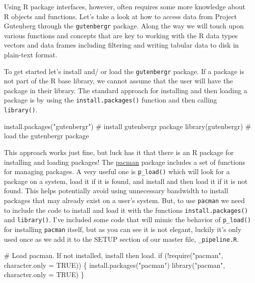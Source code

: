\documentclass[
  letterpaper,
]{latex/krantz}
\newenvironment{Shaded}{\begin{snugshade}}{\end{snugshade}}
\newcommand{\AttributeTok}[1]{\textcolor[rgb]{0.40,0.45,0.13}{#1}}
\newcommand{\CommentTok}[1]{\textcolor[rgb]{0.37,0.37,0.37}{#1}}
\newcommand{\ConstantTok}[1]{\textcolor[rgb]{0.56,0.35,0.01}{#1}}
\newcommand{\ControlFlowTok}[1]{\textcolor[rgb]{0.00,0.23,0.31}{#1}}
\newcommand{\FunctionTok}[1]{\textcolor[rgb]{0.28,0.35,0.67}{#1}}
\newcommand{\NormalTok}[1]{\textcolor[rgb]{0.00,0.23,0.31}{#1}}
\newcommand{\SpecialCharTok}[1]{\textcolor[rgb]{0.37,0.37,0.37}{#1}}
\newcommand{\StringTok}[1]{\textcolor[rgb]{0.13,0.47,0.30}{#1}}
\begin{document}
Using R package interfaces, however, often requires some more knowledge
about R objects and functions. Let's take a look at how to access data
from Project Gutenberg through the \texttt{gutenbergr} package. Along
the way we will touch upon various functions and concepts that are key
to working with the R data types vectors and data frames including
filtering and writing tabular data to disk in plain-text format.

To get started let's install and/ or load the \texttt{gutenbergr}
package. If a package is not part of the R base library, we cannot
assume that the user will have the package in their library. The
standard approach for installing and then loading a package is by using
the \texttt{install.packages()} function and then calling
\texttt{library()}.

\begin{Shaded}
\begin{Highlighting}[]
\FunctionTok{install.packages}\NormalTok{(}\StringTok{"gutenbergr"}\NormalTok{) }\CommentTok{\# install \textasciigrave{}gutenbergr\textasciigrave{} package}
\FunctionTok{library}\NormalTok{(gutenbergr) }\CommentTok{\# load the \textasciigrave{}gutenbergr\textasciigrave{} package}
\end{Highlighting}
\end{Shaded}

This approach works just fine, but luck has it that there is an R
package for installing and loading packages! The
\href{https://CRAN.R-project.org/package=pacman}{pacman} package
includes a set of functions for managing packages. A very useful one is
\texttt{p\_load()} which will look for a package on a system, load it if
it is found, and install and then load it if it is not found. This helps
potentially avoid using unnecessary bandwidth to install packages that
may already exist on a user's system. But, to use \texttt{pacman} we
need to include the code to install and load it with the functions
\texttt{install.packages()} and \texttt{library()}. I've included some
code that will mimic the behavior of \texttt{p\_load()} for installing
\texttt{pacman} itself, but as you can see it is not elegant, luckily
it's only used once as we add it to the SETUP section of our master
file, \texttt{\_pipeline.R}.

\begin{Shaded}
\begin{Highlighting}[]
\CommentTok{\# Load \textasciigrave{}pacman\textasciigrave{}. If not installed, install then load.}
\ControlFlowTok{if}\NormalTok{ (}\SpecialCharTok{!}\FunctionTok{require}\NormalTok{(}\StringTok{"pacman"}\NormalTok{, }\AttributeTok{character.only =} \ConstantTok{TRUE}\NormalTok{)) \{}
  \FunctionTok{install.packages}\NormalTok{(}\StringTok{"pacman"}\NormalTok{)}
  \FunctionTok{library}\NormalTok{(}\StringTok{"pacman"}\NormalTok{, }\AttributeTok{character.only =} \ConstantTok{TRUE}\NormalTok{)}
\NormalTok{\}}
\end{Highlighting}
\end{Shaded}
\end{document}
